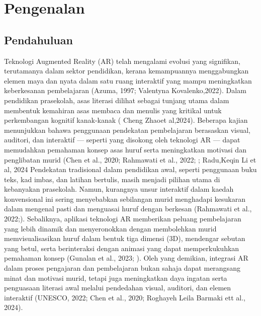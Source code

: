 \chapter{Pengenalan}
\label{bab:pengenalan}



\section{Pendahuluan}

Teknologi Augmented Reality (AR) telah mengalami evolusi yang signifikan, terutamanya dalam sektor pendidikan, kerana kemampuannya menggabungkan elemen maya dan nyata dalam satu ruang interaktif yang mampu meningkatkan keberkesanan pembelajaran (Azuma, 1997; Valentyna Kovalenko,2022). Dalam pendidikan prasekolah, asas literasi dilihat sebagai tunjang utama dalam membentuk kemahiran asas membaca dan menulis yang kritikal untuk perkembangan kognitif kanak-kanak ( Cheng Zhaoet al,2024). Beberapa kajian menunjukkan bahawa penggunaan pendekatan pembelajaran berasaskan visual, auditori, dan interaktif --- seperti yang disokong oleh teknologi AR --- dapat memudahkan pemahaman konsep asas huruf serta meningkatkan motivasi dan penglibatan murid (Chen et al., 2020; Rahmawati et al., 2022; ; Radu,Keqin Li et al, 2024
\hspace{1cm}Pendekatan tradisional dalam pendidikan awal, seperti penggunaan buku teks, kad imbas, dan latihan bertulis, masih menjadi pilihan utama di kebanyakan prasekolah. Namun, kurangnya unsur interaktif dalam kaedah konvensional ini sering menyebabkan sebilangan murid menghadapi kesukaran dalam mengenal pasti dan menguasai huruf dengan berkesan (Rahmawati et al., 2022;). Sebaliknya, aplikasi teknologi AR memberikan peluang pembelajaran yang lebih dinamik dan menyeronokkan dengan membolehkan murid memvisualisasikan huruf dalam bentuk tiga dimensi (3D), mendengar sebutan yang betul, serta berinteraksi dengan animasi yang dapat memperkukuhkan pemahaman konsep (Gunalan et al., 2023; ). Oleh yang demikian, integrasi AR dalam proses pengajaran dan pembelajaran bukan sahaja dapat merangsang minat dan motivasi murid, tetapi juga meningkatkan daya ingatan serta penguasaan literasi awal melalui pendedahan visual, auditori, dan elemen interaktif (UNESCO, 2022; Chen et al., 2020;  Roghayeh Leila Barmaki ett al., 2024).

